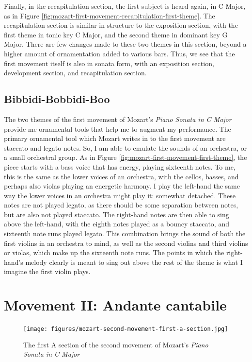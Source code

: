 Finally, in the recapitulation section, the first subject is heard again, in C Major, as in Figure \ref{fig:mozart-first-movement-recapitulation-first-theme}\autocite{Henle_1977}. The recapitulation section is similar in structure to the exposition section, with the first theme in tonic key C Major, and the second theme in dominant key G Major. There are few changes made to these two themes in this section, beyond a higher amount of ornamentation added to various bars. Thus, we see that the first movement itself is also in sonata form, with an exposition section, development section, and recapitulation section.

\subsection{Bibbidi-Bobbidi-Boo}

The two themes of the first movement of Mozart's \textit{Piano Sonata in C Major} provide me ornamental tools that help me to augment my performance. The primary ornamental tool which Mozart writes in to the first movement are staccato and legato notes. So, I am able to emulate the sounds of an orchestra, or a small orchestral group. As in Figure \ref{fig:mozart-first-movement-first-theme}\autocite{Henle_1977}, the piece starts with a bass voice that has energy, playing sixteenth notes. To me, this is the same as the lower voices of an orchestra, with the cellos, basses, and perhaps also violas playing an energetic harmony. I play the left-hand the same way the lower voices in an orchestra might play it: somewhat detached. These notes are not played legato, as there should be some separation between notes, but are also not played staccato. The right-hand notes are then able to sing above the left-hand, with the eighth notes played as a bouncy staccato, and sixteenth note runs played legato. This combination brings the sound of both the first violins in an orchestra to mind, as well as the second violins and third violins or violas, which make up the sixteenth note runs. The points in which the right-hand's melody clearly is meant to sing out above the rest of the theme is what I imagine the first violin plays. 

\section{Movement II: Andante cantabile}

\begin{figure}
    \centering
    \texttt{[image: figures/mozart-second-movement-first-a-section.jpg]}
    \caption{The first A section of the second movement of Mozart's \textit{Piano Sonata in C Major}}
    \label{fig:mozart-second-movement-first-a-section}
\end{figure}

